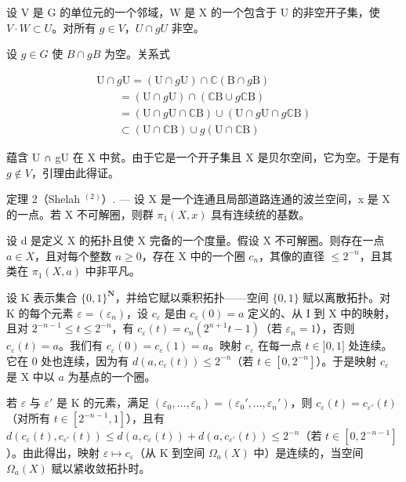 设 V 是 G 的单位元的一个邻域，W 是 X 的一个包含于 U 的非空开子集，使 \(V \cdot W \subset U\)。对所有 \(g \in V\)，\(U \cap gU\) 非空。

设 \(g \in G\) 使 \(B \cap gB\) 为空。关系式

\[
\begin{array}{l} \mathrm{U} \cap g \mathrm{U} = (\mathrm{U} \cap g \mathrm{U}) \cap \mathbb {C} (\mathrm{B} \cap g \mathrm{B}) \\ \qquad = (\mathrm{U} \cap g \mathrm{U}) \cap (\mathbb {C} \mathrm{B} \cup g \mathbb {C} \mathrm{B}) \\ \qquad = (\mathrm{U} \cap g \mathrm{U} \cap \mathbb {C} \mathrm{B}) \cup (\mathrm{U} \cap g \mathrm{U} \cap g \mathbb {C} \mathrm{B}) \\ \qquad \subset (\mathrm{U} \cap \mathbb {C} \mathrm{B}) \cup g (\mathrm{U} \cap \mathbb {C} \mathrm{B}) \end{array}
\]

蕴含 U ∩ gU 在 X 中贫。由于它是一个开子集且 X 是贝尔空间，它为空。于是有 \(g \notin V\)，引理由此得证。

定理 2（Shelah \(^{(2)}\)）. --- 设 X 是一个连通且局部道路连通的波兰空间，x 是 X 的一点。若 X 不可解圈，则群 \(\pi_{1}(X,x)\) 具有连续统的基数。

设 d 是定义 X 的拓扑且使 X 完备的一个度量。假设 X 不可解圈。则存在一点 \(a \in X\)，且对每个整数 \(n \geqslant 0\)，存在 X 中的一个圈 \(c_{n}\)，其像的直径 \(\leqslant 2^{-n}\)，且其类在 \(\pi_{1}(X, a)\) 中非平凡。

设 K 表示集合 \(\{0,1\}^{\mathbf{N}}\)，并给它赋以乘积拓扑——空间 \(\{0,1\}\) 赋以离散拓扑。对 K 的每个元素 \(\varepsilon = (\varepsilon_n)\)，设 \(c_{\varepsilon}\) 是由 \(c_{\varepsilon}(0) = a\) 定义的、从 I 到 X 中的映射，且对 \(2^{-n - 1} \leqslant t \leqslant 2^{-n}\)，有 \(c_{\varepsilon}(t) = c_n(2^{n + 1}t - 1)\)（若 \(\varepsilon_n = 1\)），否则 \(c_{\varepsilon}(t) = a\)。我们有 \(c_{\varepsilon}(0) = c_{\varepsilon}(1) = a\)。映射 \(c_{\varepsilon}\) 在每一点 \(t \in ]0,1]\) 处连续。它在 0 处也连续，因为有 \(d(a,c_{\varepsilon}(t)) \leqslant 2^{-n}\)（若 \(t \in [0,2^{-n}] \)）。于是映射 \(c_{\varepsilon}\) 是 X 中以 \(a\) 为基点的一个圈。

若 \(\varepsilon\) 与 \(\varepsilon'\) 是 K 的元素，满足 \((\varepsilon_0, \ldots, \varepsilon_n) = (\varepsilon_0', \ldots, \varepsilon_n')\)，则 \(c_{\varepsilon}(t) = c_{\varepsilon'}(t)\)（对所有 \(t \in [2^{-n-1}, 1]\)），且有 \(d(c_{\varepsilon}(t), c_{\varepsilon'}(t)) \leqslant d(a, c_{\varepsilon}(t)) + d(a, c_{\varepsilon'}(t)) \leqslant 2^{-n}\)（若 \(t \in [0, 2^{-n-1}]\)）。由此得出，映射 \(\varepsilon \mapsto c_{\varepsilon}\)（从 K 到空间 \(\Omega_a(X)\) 中）是连续的，当空间 \(\Omega_a(X)\) 赋以紧收敛拓扑时。

